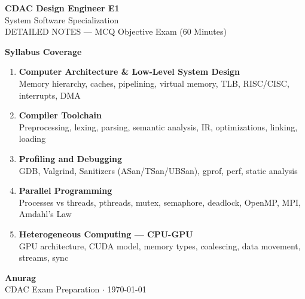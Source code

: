 \documentclass[11pt,a4paper]{article}
\begin{document}

\begin{titlepage}

\vspace*{0.5cm}
{\color{white}\fontsize{28}{34}\selectfont\bfseries CDAC Design Engineer E1}\\[0.5cm]
{\color{white}\fontsize{18}{22}\selectfont System Software Specialization}\\[0.3cm]
{\color{white!80}\large DETAILED NOTES --- MCQ Objective Exam (60 Minutes)}

\vspace{5cm}

\begin{tcolorbox}[
  enhanced, arc=8pt,
  colback=white, colframe=darkblue, boxrule=2pt,
  width=\linewidth
]
\begin{center}
{\large\bfseries\color{darkblue} Syllabus Coverage}
\end{center}
\begin{enumerate}[leftmargin=1.5cm, itemsep=4pt]
  \item[\textbf{U1.}] \textbf{Computer Architecture \& Low-Level System Design}\\
        \small Memory hierarchy, caches, pipelining, virtual memory, TLB, RISC/CISC, interrupts, DMA
  \item[\textbf{U2.}] \textbf{Compiler Toolchain}\\
        \small Preprocessing, lexing, parsing, semantic analysis, IR, optimizations, linking, loading
  \item[\textbf{U3.}] \textbf{Profiling and Debugging}\\
        \small GDB, Valgrind, Sanitizers (ASan/TSan/UBSan), gprof, perf, static analysis
  \item[\textbf{U4.}] \textbf{Parallel Programming}\\
        \small Processes vs threads, pthreads, mutex, semaphore, deadlock, OpenMP, MPI, Amdahl's Law
  \item[\textbf{U5.}] \textbf{Heterogeneous Computing --- CPU-GPU}\\
        \small GPU architecture, CUDA model, memory types, coalescing, data movement, streams, sync
\end{enumerate}
\end{tcolorbox}

\vfill
\begin{flushright}
  {\large\bfseries\color{darkblue} Anurag}\\
  {\color{midgray} CDAC Exam Preparation $\cdot$ \today}
\end{flushright}
\end{titlepage}
\end{document}
